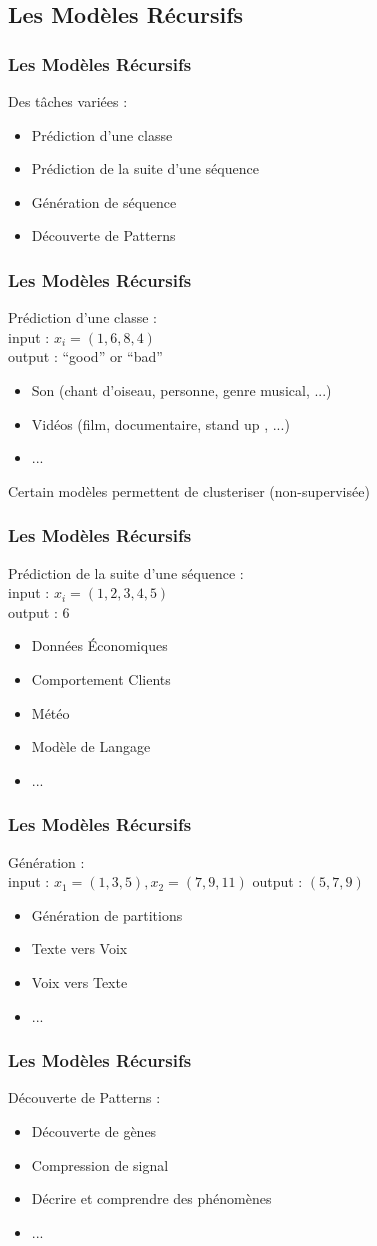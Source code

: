 \subsection{Les Modèles Récursifs}

\begin{frame}
  \frametitle{Les Modèles Récursifs}
  Des tâches variées :
  \begin{itemize}
  \item Prédiction d'une classe
  \item Prédiction de la suite d'une séquence
  \item Génération de séquence
  \item Découverte de Patterns
  \end{itemize}
\end{frame}

\begin{frame}
  \frametitle{Les Modèles Récursifs}
  Prédiction d'une classe : \\
  input : $x_i=(1,6,8,4)$ \\
  output : ``good'' or ``bad''
  \begin{itemize}
  \item Son (chant d'oiseau, personne, genre musical, ...)
  \item Vidéos (film, documentaire, stand up , ...)
  \item ...
  \end{itemize}
  Certain modèles permettent de clusteriser (non-supervisée)
\end{frame}

\begin{frame}
  \frametitle{Les Modèles Récursifs}
  Prédiction de la suite d'une séquence : \\
  input : $x_i=(1,2,3,4,5)$ \\
  output : 6
  \begin{itemize}
  \item Données Économiques
  \item Comportement Clients
  \item Météo
  \item Modèle de Langage
  \item ...
  \end{itemize}
\end{frame}

\begin{frame}
  \frametitle{Les Modèles Récursifs}
  Génération : \\
  input : $x_1=(1,3,5),x_2=(7,9,11)$
  output : $(5,7,9)$
  \begin{itemize}
  \item Génération de partitions
  \item Texte vers Voix
  \item Voix vers Texte
  \item ...
  \end{itemize}
\end{frame}

\begin{frame}
  \frametitle{Les Modèles Récursifs}
  Découverte de Patterns :
  \begin{itemize}
  \item Découverte de gènes
  \item Compression de signal
  \item Décrire et comprendre des phénomènes
  \item ...
  \end{itemize}
\end{frame}
